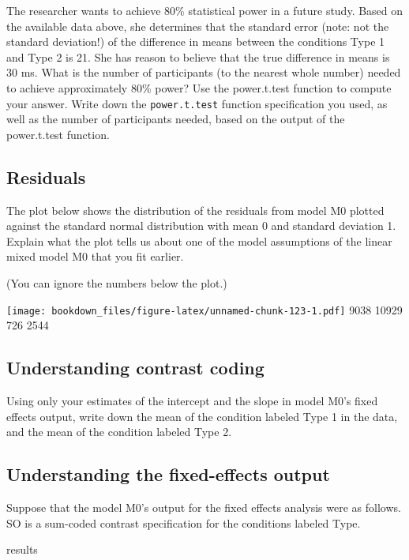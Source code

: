 \documentclass[12pt,]{krantz}
\newenvironment{Shaded}{\begin{snugshade}}{\end{snugshade}}
\newcommand{\NormalTok}[1]{#1}
\begin{document}
The researcher wants to achieve 80\% statistical power in a future study. Based on the available data above, she determines that the standard error (note: not the standard deviation!) of the difference in means between the conditions Type 1 and Type 2 is 21. She has reason to believe that the true difference in means is 30 ms. What is the number of participants (to the nearest whole number) needed to achieve approximately 80\% power? Use the power.t.test function to compute your answer. Write down the \texttt{power.t.test} function specification you used, as well as the number of participants needed, based on the output of the power.t.test function.

\hypertarget{sec:LMExercisesPart5}{%
\subsection{Residuals}\label{sec:LMExercisesPart5}}

The plot below shows the distribution of the residuals from model M0 plotted against the standard normal distribution with mean 0 and standard deviation 1. Explain what the plot tells us about one of the model assumptions of the linear mixed model M0 that you fit earlier.

(You can ignore the numbers below the plot.)

\texttt{[image: bookdown\_files/figure-latex/unnamed-chunk-123-1.pdf]} 9038 10929
726 2544

\hypertarget{sec:LMExercisesPart6}{%
\subsection{Understanding contrast coding}\label{sec:LMExercisesPart6}}

Using only your estimates of the intercept and the slope in model M0's fixed effects output, write down the mean of the condition labeled Type 1 in the data, and the mean of the condition labeled Type 2.

\hypertarget{sec:LMExercisesPart7}{%
\subsection{Understanding the fixed-effects output}\label{sec:LMExercisesPart7}}

Suppose that the model M0's output for the fixed effects analysis were as follows. SO is a sum-coded contrast specification for the conditions labeled Type.

\begin{Shaded}
\begin{Highlighting}[]
\NormalTok{results}
\end{Highlighting}
\end{Shaded}
\end{document}
